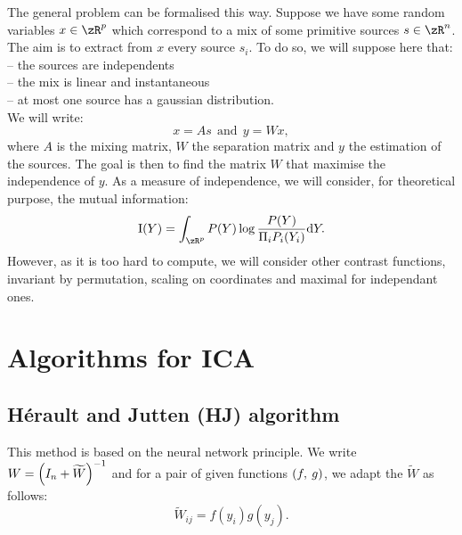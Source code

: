 \documentclass[10pt, a4paper, twocolumn]{article}
\newcommand{\mysection}[1]{\vspace{-0pt}\section{#1}\vspace{0pt}}
\newcommand{\mysubsection}[1]{\vspace{-7pt}\subsection{\normalsize #1}\vspace{-2pt}}
\newcommand{\zZ}[2]{\mathrm #1\!\zp{#2}}
\begin{document}
The general problem can be formalised this way.
Suppose we have some random variables $x\in\zR^p$ which correspond to
a mix of some primitive sources $s\in\zR^n$. The aim is to extract
from $x$ every source $s_i$. To do so, we will suppose here that:\\
-- the sources are independents\\
-- the mix is linear and instantaneous\\
-- at most one source has a gaussian distribution.\\
We will write:
\begin{equation}
  x = A s \ \ \mbox{and} \ \ y = W x,
\end{equation}
where $A$ is the mixing matrix, $W$ the separation matrix and $y$ the
estimation of the sources. The goal is then to find the matrix $W$ that
maximise the independence of $y$.
As a measure of independence, we will consider, for theoretical purpose,
the mutual information:\begin{equation}
  \zZ IY = \int_{\zR^p} P(Y) \log\frac{P(Y)}{\Pi_i P_i(Y_i)} \zdx Y.
\end{equation}
However, as it is too hard to compute, we will consider other contrast functions, invariant by permutation, scaling on coordinates and maximal for independant ones.



\mysection{Algorithms for ICA}
\mysubsection{Hérault and Jutten (HJ) algorithm}
This method is based on the neural network principle.
We write $W = \zp{I_n+\widetilde W}^{-1}$ and for a pair of given functions $\zp{f,\:g}$, we adapt the $\widetilde W$ as follows:\begin{equation}
\widetilde W_{ij} = f(y_i) g(y_j).
\end{equation}
\end{document}
